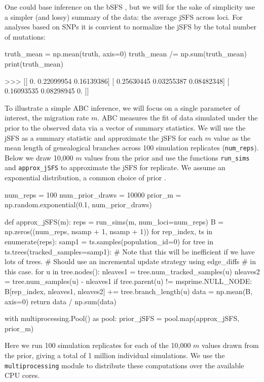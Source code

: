 \documentclass[graybox]{svmult}
\begin{document}
    One could base inference on the bSFS \citep{Lohse2016, Beeravolu2017}, but we will for the sake of simplicity use a simpler (and lossy)
summary of the data: the average jSFS across loci. For analyses based on
SNPs it is convient to normalize the jSFS by the total number of
mutations:
\begin{pythoncode}
truth_mean = np.mean(truth, axis=0)
truth_mean /= np.sum(truth_mean)
print(truth_mean)

>>> [[ 0.          0.22099954  0.16139386]
     [ 0.25630445  0.03255387  0.08482348]
     [ 0.16093535  0.08298945  0.        ]]
\end{pythoncode}

    To illustrate a simple ABC inference, we will focus on a single
parameter of interest, the migration rate \(m\).
ABC measures the fit of data simulated under the prior to the observed
data via a vector of summary statistics. We will use the jSFS as a
summary statistic and approximate the jSFS for each \(m\) value as the
mean length of genealogical branches across 100 simulation replicates (\texttt{num\_reps}). Below we
draw 10,000 \(m\) values from the prior and use the functions
\texttt{run\_sims} and \texttt{approx\_jSFS} to approximate the jSFS for
 replicate. We assume an exponential distribution, a common choice of prior
\citep{hey2004multilocus}.

\begin{pythoncode}
num_reps = 100
num_prior_draws = 10000
prior_m = np.random.exponential(0.1, num_prior_draws)

def approx_jSFS(m):
    reps = run_sims(m, num_loci=num_reps)
    B = np.zeros((num_reps, nsamp + 1, nsamp + 1))
    for rep_index, ts in enumerate(reps):
        samp1 = ts.samples(population_id=0)
        for tree in ts.trees(tracked_samples=samp1):
            # Note that this will be inefficient if we have lots of trees.
            # Should use an incremental update strategy using edge_diffs
            # in this case.
            for u in tree.nodes():
                nleaves1 = tree.num_tracked_samples(u)
                nleaves2 = tree.num_samples(u) - nleaves1
                if tree.parent(u) != msprime.NULL_NODE:
                    B[rep_index, nleaves1, nleaves2] += tree.branch_length(u)
    data = np.mean(B, axis=0)
    return data / np.sum(data)

with multiprocessing.Pool() as pool:
    prior_jSFS = pool.map(approx_jSFS, prior_m)
\end{pythoncode}

Here we run 100 simulation replicates for each of the 10,000
$m$ values drawn from the prior, giving a total of 1 million individual simulations.
We use the \texttt{multiprocessing} module to distribute these
computations over the available CPU cores.
\end{document}
